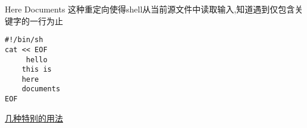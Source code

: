 
\begin{frame}[fragile]{Here Documents}
这种重定向使得shell从当前源文件中读取输入,知道遇到仅包含关键字的一行为止
\begin{verbatim}
#!/bin/sh
cat << EOF
     hello
    this is 
    here 
    documents
EOF 
\end{verbatim}
\href{http://blog.wgzhao.com/2009/08/24/here-documents-in-bash.html}{几种特别的用法}
\end{frame}

